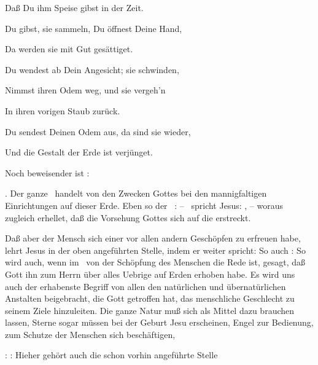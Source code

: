\begin{aufza}
{Daß Du ihm Speise gibst in der Zeit.\par
Du gibst, sie sammeln, Du öffnest Deine Hand,\par
Da werden sie mit Gut gesättiget.\par
Du wendest ab Dein Angesicht; sie schwinden,\par
Nimmst ihren Odem weg, und sie vergeh'n\par
In ihren vorigen Staub zurück.\par
Du sendest Deinen Odem aus, da sind sie wieder,\par
Und die Gestalt der Erde ist verjünget.}\par
Noch beweisender ist : 
\item {}. Der ganze \ handelt von den Zwecken Gottes bei den mannigfaltigen Einrichtungen auf dieser Erde. Eben so der \ :  -- \ spricht Jesus: , -- woraus zugleich erhellet, daß die Vorsehung Gottes sich auf die  erstreckt.
\item Daß aber der Mensch sich einer  vor allen andern Geschöpfen zu erfreuen habe, lehrt Jesus in der oben angeführten Stelle, indem er weiter spricht:  So auch :  So wird auch, wenn im \ von der Schöpfung des Menschen die Rede ist, gesagt, daß Gott ihn zum Herrn über alles Uebrige auf Erden erhoben habe. Es wird uns auch der erhabenste Begriff von allen den natürlichen und übernatürlichen Anstalten beigebracht, die Gott getroffen hat, das menschliche Geschlecht zu seinem Ziele hinzuleiten. Die ganze Natur muß sich als Mittel dazu brauchen lassen, Sterne sogar müssen bei der Geburt Jesu erscheinen, Engel zur Bedienung, zum Schutze der Menschen sich beschäftigen, \usw\
\item {}:  :  Hieher gehört auch die schon vorhin angeführte Stelle 
\end{aufza}

